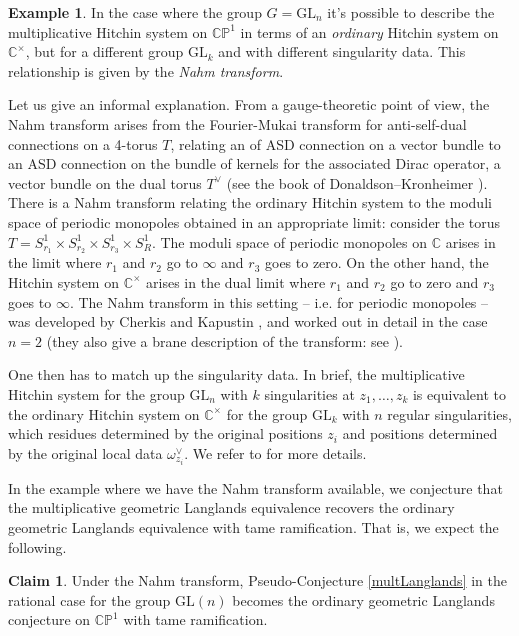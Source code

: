 \documentclass[11pt, oneside, reqno]{amsart}
\theoremstyle{definition} \newtheorem{definition}{Definition}[section]
\newtheorem*{claim}{Claim}
\theoremstyle{definition} \newtheorem{remark}[definition]{Remark}
\theoremstyle{definition} \newtheorem{remarks}[definition]{Remarks}
\theoremstyle{definition} \newtheorem{question}[definition]{Question}
\theoremstyle{definition} \newtheorem*{note}{Note}
\theoremstyle{definition} \newtheorem{example}[definition]{Example}
\theoremstyle{definition} \newtheorem{examples}[definition]{Examples}
\newcommand{\bb}[1]{\mathbb{#1}}
\newcommand{\CC}{\mathbb{C}}
\newcommand{\GL}{\mathrm{GL}}
\begin{document}
\begin{example} \label{Nahm_example}
In the case where the group $G=\GL_n$ it's possible to describe the multiplicative Hitchin system on $\bb{CP}^1$ in terms of an \emph{ordinary} Hitchin system on $\CC^\times$, but for a different group $\GL_k$ and with different singularity data.  This relationship is given by the \emph{Nahm transform}.  

Let us give an informal explanation.  From a gauge-theoretic point of view, the Nahm transform arises from the Fourier-Mukai transform for anti-self-dual connections on a 4-torus $T$, relating an of ASD connection on a vector bundle to an ASD connection on the bundle of kernels for the associated Dirac operator, a vector bundle on the dual torus $T^\vee$ (see the book of Donaldson--Kronheimer \cite[Section 3.2]{DonaldsonKronheimer}).  There is a Nahm transform relating the ordinary Hitchin system to the moduli space of periodic monopoles obtained in an appropriate limit: consider the torus $T = S^1_{r_1} \times S^1_{r_2} \times S^1_{r_3} \times S^1_{R}$.  The moduli space of periodic monopoles on $\CC$ arises in the limit where $r_1$ and $r_2$ go to $\infty$ and $r_3$ goes to zero.  On the other hand, the Hitchin system on $\CC^\times$ arises in the dual limit where $r_1$ and $r_2$ go to zero and $r_3$ goes to $\infty$.  The Nahm transform in this setting -- i.e. for periodic monopoles -- was developed by Cherkis and Kapustin \cite{CherkisKapustin2}, and worked out in detail in the case $n=2$ (they also give a brane description of the transform: see \cite[Section 2]{CherkisKapustin2}).

One then has to match up the singularity data.  In brief, the multiplicative Hitchin system for the group $\GL_n$ with $k$ singularities at $z_1, \ldots, z_k$ is equivalent to the ordinary Hitchin system on $\CC^\times$ for the group $\GL_k$ with $n$ regular singularities, which residues determined by the original positions $z_i$ and positions determined by the original local data $\omega^\vee_{z_i}$.  We refer to \cite[Section 7.1]{NekrasovPestun} for more details.

In the example where we have the Nahm transform available, we conjecture that the multiplicative geometric Langlands equivalence recovers the ordinary geometric Langlands equivalence with tame ramification.  That is, we expect the following.

\begin{claim}
Under the Nahm transform, Pseudo-Conjecture \ref{multLanglands} in the rational case for the group $\GL(n)$ becomes the ordinary geometric Langlands conjecture on $\bb{CP}^1$ with tame ramification.
\end{claim}
\end{example}
\end{document}
